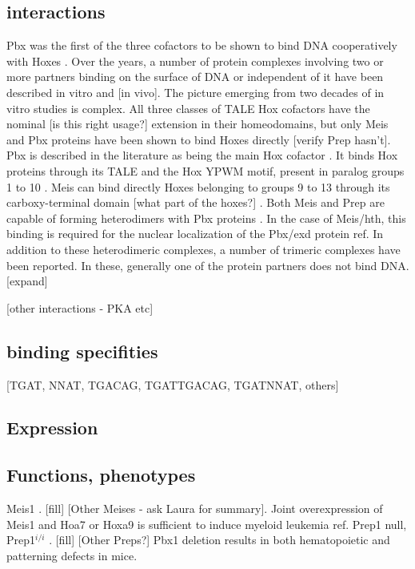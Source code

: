 \subsection{interactions}

		Pbx was the first of the three cofactors to be shown to bind DNA cooperatively with Hoxes \cite{ref}. Over the years, a number of protein complexes involving two or more partners binding on the surface of DNA or independent of it have been described in vitro and [in vivo]. The picture emerging from two decades of in vitro studies is complex. 
		All three classes of TALE Hox cofactors have the nominal [is this right usage?] extension in their homeodomains, but only Meis and Pbx proteins have been shown to bind Hoxes directly [verify Prep hasn't]. Pbx is described in the literature as being the main Hox cofactor \cite{ref}. It binds Hox proteins through its TALE and the Hox YPWM motif, present in paralog groups 1 to 10 \cite{refs, Passner1999}. Meis can bind directly Hoxes belonging to groups 9 to 13 through its carboxy-terminal domain [what part of the hoxes?] \cite{ref}. 
		Both Meis and Prep are capable of forming heterodimers with Pbx proteins \cite{ref}. In the case of Meis/hth, this binding is required for the nuclear localization of the Pbx/exd protein {ref}. 
		In addition to these heterodimeric complexes, a number of trimeric complexes have been reported. In these, generally one of the protein partners does not bind DNA. [expand]

		[other interactions - PKA etc]

\subsection{binding specifities}
		
		
		
		[TGAT, NNAT, TGACAG, TGATTGACAG, TGATNNAT, others]

\subsection{Expression}
\subsection{Functions, phenotypes}

		Meis1  \cite{Azcoitia2005, Carramolino2010}. [fill] [Other Meises - ask Laura for summary]. Joint overexpression of Meis1 and Hoa7 or Hoxa9 is sufficient to induce myeloid leukemia {ref}.
		Prep1 null, Prep1$^{i/i}$ \cite{Ferretti2006, Fernandez-Diaz2010, Longobardi2010}. [fill] [Other Preps?]
		Pbx1 deletion results in both hematopoietic \cite{DiMartino2001} and patterning \cite{Selleri et al. 2001} defects in mice.

